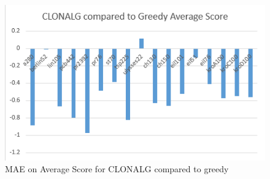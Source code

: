 \begin{figure}[H]
	\includegraphics[]{Images/CLONALG_Fig_Avg.png}
	\caption{MAE on Average Score for CLONALG compared to greedy}
	\label{CLONALG_Avg}
\end{figure}
